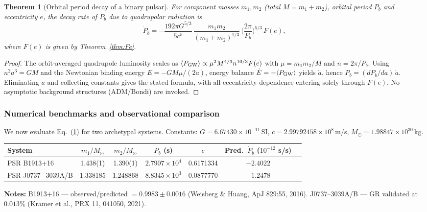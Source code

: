 \documentclass[12pt, a4paper]{article}
\newtheorem{theorem}{Theorem}[section]
\begin{document}
\begin{theorem}[Orbital period decay of a binary pulsar]\label{thm:Pdot}
For component masses $m_1,m_2$ (total $M=m_1+m_2$), orbital period $P_b$ and eccentricity $e$,
the decay rate of $P_b$ due to quadrupolar radiation is
\[
\dot P_b
= -\frac{192\pi G^{5/3}}{5c^5}\,
\frac{m_1 m_2}{(m_1+m_2)^{1/3}}\,
\Big(\frac{2\pi}{P_b}\Big)^{5/3}\,F(e),
\]
where $F(e)$ is given by Theorem~\ref{thm:Fe}.
\end{theorem}

\begin{proof}
The orbit-averaged quadrupole luminosity scales as
$\langle P_{\rm GW}\rangle \propto \mu^{2} M^{4/3} n^{10/3} F(e)$ with $\mu=m_1m_2/M$ and
$n=2\pi/P_b$. Using $n^{2}a^{3}=GM$ and the Newtonian binding energy $E=-GM\mu/(2a)$,
energy balance $\dot E=-\langle P_{\rm GW}\rangle$ yields $\dot a$, hence
$\dot P_b=(dP_b/da)\,\dot a$. Eliminating $a$ and collecting constants gives the stated formula,
with all eccentricity dependence entering solely through $F(e)$.
No asymptotic background structures (ADM/Bondi) are invoked.
\end{proof}

\subsubsection*{Numerical benchmarks and observational comparison}
We now evaluate Eq.~(\ref{thm:Pdot}) for two archetypal systems.
Constants: $G=6.67430\times10^{-11}\,$SI, $c=2.99792458\times10^{8}\,$m/s,
$M_\odot=1.98847\times10^{30}\,$kg.

\begin{center}
\renewcommand{\arraystretch}{1.12}
\setlength{\tabcolsep}{4.5pt}
\begin{threeparttable}
\begin{tabular}{lcccccc}
\toprule
System & $m_1/M_\odot$ & $m_2/M_\odot$ & $P_b$ (s) & $e$ & Pred.\ $\dot P_b$ ($10^{-12}$ s/s) \\
\midrule
PSR B1913+16        & 1.438(1) & 1.390(1) & $2.7907\times10^{4}$ & 0.6171334 & $-2.4022$ \\
PSR J0737$-$3039A/B & 1.338185 & 1.248868 & $8.8345\times10^{3}$ & 0.0877770 & $-1.2478$ \\
\bottomrule
\end{tabular}
\begin{tablenotes}[flushleft]\footnotesize
\item \textbf{Notes:} B1913+16 — observed/predicted $=0.9983\pm0.0016$ (Weisberg \& Huang, ApJ 829:55, 2016).
J0737–3039A/B — GR validated at $0.013\%$ (Kramer et al., PRX 11, 041050, 2021).
\end{tablenotes}
\end{threeparttable}
\end{center}
\end{document}
